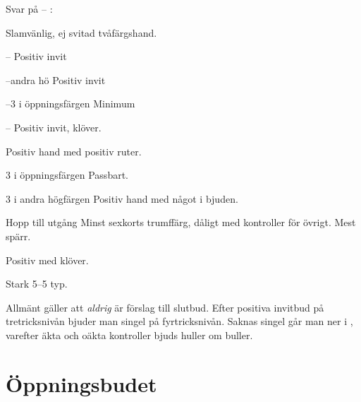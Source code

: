 Svar p{\aa}  -- :
\begin{beskriv}
   \item[\kl{3}] Slamvänlig, ej svitad tvåfärgshand.
      \bbe
         \item[--\ru{3}] Positiv invit
         \item[--andra hö] Positiv invit
         \item[--3 i öppningsfärgen] Minimum
         \item[--\NT{3}] Positiv invit, klöver.
       \ebe
   \item[\ru{3}] Positiv hand med positiv ruter. 
   \item[3 i \"oppningsf\"argen] Passbart.
   \item[3 i andra h\"ogf\"argen] Positiv hand med något i bjuden.
   \item[Hopp till utg{\aa}ng] Minst sexkorts trumff\"arg, d{\aa}ligt
                               med kontroller f\"or \"ovrigt. Mest spärr.
   \item[\NT{3}] Positiv med klöver.
   \item[\la{4}] Stark 5--5 typ.
\end{beskriv}

Allm\"ant g\"aller att  {\em aldrig} \"ar f\"orslag till slutbud.
Efter positiva invitbud på tretricksnivån bjuder man singel på
fyrtricksnivån. Saknas singel går man ner i , varefter äkta och oäkta
kontroller bjuds huller om buller.

\section{{\"O}ppningsbudet }

